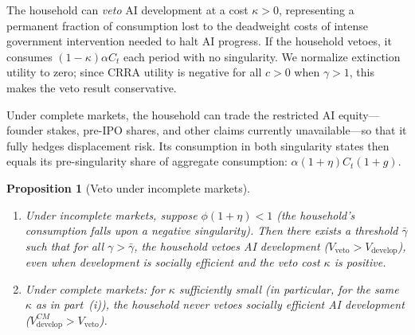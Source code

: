 \documentclass[12pt]{article}
\newtheorem{proposition}{Proposition}
\begin{document}
The household can \emph{veto} AI development at a cost $\kappa > 0$, representing a permanent fraction of consumption lost to the deadweight costs of intense government intervention needed to halt AI progress. If the household vetoes, it consumes $(1-\kappa)\alpha C_t$ each period with no singularity. We normalize extinction utility to zero; since CRRA utility is negative for all $c > 0$ when $\gamma > 1$, this makes the veto result conservative.

Under complete markets, the household can trade the restricted AI equity---founder stakes, pre-IPO shares, and other claims currently unavailable---so that it fully hedges displacement risk. Its consumption in both singularity states then equals its pre-singularity share of aggregate consumption: $\alpha(1+\eta)C_t(1+g)$.

\begin{proposition}[Veto under incomplete markets] \label{prop:veto} %
\begin{enumerate}
\item[(i)] Under incomplete markets, suppose $\phi(1+\eta) < 1$ (the household's consumption falls upon a negative singularity). Then there exists a threshold $\bar{\gamma}$ such that for all $\gamma > \bar{\gamma}$, the household vetoes AI development ($V_\text{veto} > V_\text{develop}$), even when development is socially efficient and the veto cost $\kappa$ is positive.
\item[(ii)] Under complete markets: for $\kappa$ sufficiently small (in particular, for the same $\kappa$ as in part~(i)), the household never vetoes socially efficient AI development ($V_\text{develop}^{CM} > V_\text{veto}$).
\end{enumerate}
\end{proposition}
\end{document}
